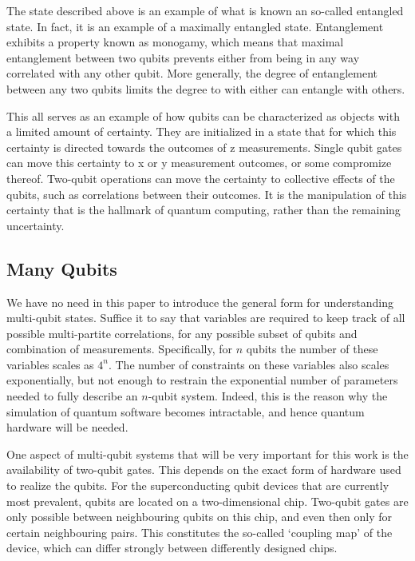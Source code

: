 \documentclass[conference]{IEEEtran}
\begin{document}
The state described above is an example of what is known an so-called entangled state. In fact, it is an example of a maximally entangled state. Entanglement exhibits a property known as monogamy, which means that maximal entanglement between two qubits prevents either from being in any way correlated with any other qubit. More generally, the degree of entanglement between any two qubits limits the degree to with either can entangle with others.

This all serves as an example of how qubits can be characterized as objects with a limited amount of certainty. They are initialized in a state that for which this certainty is directed towards the outcomes of z measurements. Single qubit gates can move this certainty to x or y measurement outcomes, or some compromize thereof. Two-qubit operations can move the certainty to collective effects of the qubits, such as correlations between their outcomes. It is the manipulation of this certainty that is the hallmark of quantum computing, rather than the remaining uncertainty.


\subsection{Many Qubits}

We have no need in this paper to introduce the general form for understanding multi-qubit states. Suffice it to say that variables are required to keep track of all possible multi-partite correlations, for any possible subset of qubits and combination of measurements. Specifically, for $n$ qubits the number of these variables scales as $4^n$. The number of constraints on these variables also scales exponentially, but not enough to restrain the exponential number of parameters needed to fully describe an $n$-qubit system. Indeed, this is the reason why the simulation of quantum software becomes intractable, and hence quantum hardware will be needed.

One aspect of multi-qubit systems that will be very important for this work is the availability of two-qubit gates. This depends on the exact form of hardware used to realize the qubits. For the superconducting qubit devices that are currently most prevalent, qubits are located on a two-dimensional chip. Two-qubit gates are only possible between neighbouring qubits on this chip, and even then only for certain neighbouring pairs. This constitutes the so-called `coupling map' of the device, which can differ strongly between differently designed chips.
\end{document}
